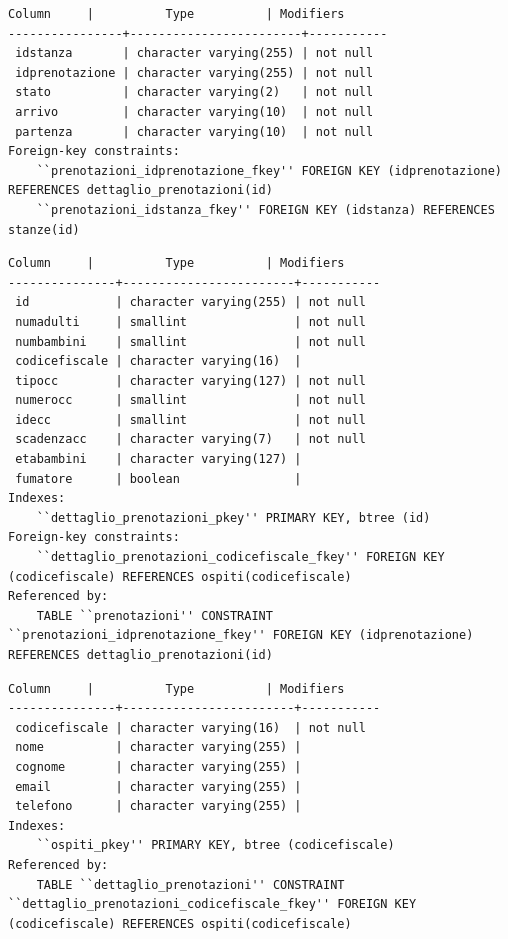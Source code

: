 \documentclass[a4paper]{article}
\begin{document}
\begin{lstlisting}[caption={Tabella: prenotazioni}]
     Column     |          Type          | Modifiers 
----------------+------------------------+-----------
 idstanza       | character varying(255) | not null
 idprenotazione | character varying(255) | not null
 stato          | character varying(2)   | not null
 arrivo         | character varying(10)  | not null
 partenza       | character varying(10)  | not null
Foreign-key constraints:
    ``prenotazioni_idprenotazione_fkey'' FOREIGN KEY (idprenotazione) REFERENCES dettaglio_prenotazioni(id)
    ``prenotazioni_idstanza_fkey'' FOREIGN KEY (idstanza) REFERENCES stanze(id)
\end{lstlisting}

\begin{lstlisting}[caption={Tabella: dettaglio\_prenotazioni}]
    Column     |          Type          | Modifiers 
---------------+------------------------+-----------
 id            | character varying(255) | not null
 numadulti     | smallint               | not null
 numbambini    | smallint               | not null
 codicefiscale | character varying(16)  | 
 tipocc        | character varying(127) | not null
 numerocc      | smallint               | not null
 idecc         | smallint               | not null
 scadenzacc    | character varying(7)   | not null
 etabambini    | character varying(127) | 
 fumatore      | boolean                | 
Indexes:
    ``dettaglio_prenotazioni_pkey'' PRIMARY KEY, btree (id)
Foreign-key constraints:
    ``dettaglio_prenotazioni_codicefiscale_fkey'' FOREIGN KEY (codicefiscale) REFERENCES ospiti(codicefiscale)
Referenced by:
    TABLE ``prenotazioni'' CONSTRAINT ``prenotazioni_idprenotazione_fkey'' FOREIGN KEY (idprenotazione) REFERENCES dettaglio_prenotazioni(id)
\end{lstlisting}

\begin{lstlisting}[caption={Tabella: ospiti}]
    Column     |          Type          | Modifiers 
---------------+------------------------+-----------
 codicefiscale | character varying(16)  | not null
 nome          | character varying(255) | 
 cognome       | character varying(255) | 
 email         | character varying(255) | 
 telefono      | character varying(255) | 
Indexes:
    ``ospiti_pkey'' PRIMARY KEY, btree (codicefiscale)
Referenced by:
    TABLE ``dettaglio_prenotazioni'' CONSTRAINT ``dettaglio_prenotazioni_codicefiscale_fkey'' FOREIGN KEY (codicefiscale) REFERENCES ospiti(codicefiscale)
\end{lstlisting}
\end{document}
